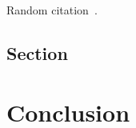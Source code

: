 \documentclass[11pt,a4paper,twoside,openany]{report}
\begin{document}
    \lipsum[5-6] Random citation~\cite{kracek-mazanek:power-balance-of-inductive-wireless-power-transfer}.

    \section{Section}
    \label{sec:first-section}

        \lipsum[7-9]

    
    \chapter*{Conclusion}
    \label{chap:conclusion}
    
    \lipsum[10-13]

    
	
\end{document}
